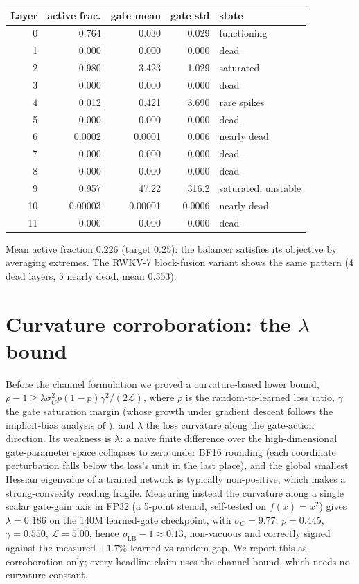 \documentclass[11pt,a4paper]{article}
\newcommand{\LL}{\mathcal{L}}
\begin{document}
\begin{center}
\begin{tabular}{rrrrl}
\toprule
Layer & active frac. & gate mean & gate std & state \\
\midrule
0 & 0.764 & 0.030 & 0.029 & functioning \\
1 & 0.000 & 0.000 & 0.000 & dead \\
2 & 0.980 & 3.423 & 1.029 & saturated \\
3 & 0.000 & 0.000 & 0.000 & dead \\
4 & 0.012 & 0.421 & 3.690 & rare spikes \\
5 & 0.000 & 0.000 & 0.000 & dead \\
6 & 0.0002 & 0.0001 & 0.006 & nearly dead \\
7 & 0.000 & 0.000 & 0.000 & dead \\
8 & 0.000 & 0.000 & 0.000 & dead \\
9 & 0.957 & 47.22 & 316.2 & saturated, unstable \\
10 & 0.00003 & 0.00001 & 0.0006 & nearly dead \\
11 & 0.000 & 0.000 & 0.000 & dead \\
\bottomrule
\end{tabular}
\end{center}

Mean active fraction $0.226$ (target $0.25$): the balancer satisfies its
objective by averaging extremes. The RWKV-7 block-fusion variant shows
the same pattern (4 dead layers, 5 nearly dead, mean $0.353$).

\section{Curvature corroboration: the $\lambda$ bound}
\label{app:lambda}

Before the channel formulation we proved a curvature-based lower bound,
$\rho - 1 \geq \lambda \sigma_C^2 p(1-p)\gamma^2 / (2\LL)$, where $\rho$
is the random-to-learned loss ratio, $\gamma$ the gate saturation margin
(whose growth under gradient descent follows the implicit-bias analysis
of \citealp{soudry2018}),
and $\lambda$ the loss curvature along the gate-action direction. Its
weakness is $\lambda$: a naive finite difference over the
high-dimensional gate-parameter space collapses to zero under BF16
rounding (each coordinate perturbation falls below the loss's unit in
the last place), and the global smallest Hessian eigenvalue of a trained
network is typically non-positive, which makes a strong-convexity
reading fragile. Measuring instead the curvature along a single scalar
gate-gain axis in FP32 (a 5-point stencil, self-tested on $f(x)=x^2$)
gives $\lambda = 0.186$ on the 140M learned-gate checkpoint, with
$\sigma_C = 9.77$, $p = 0.445$, $\gamma = 0.550$, $\LL = 5.00$, hence
$\rho_{\mathrm{LB}} - 1 \approx 0.13$, non-vacuous and correctly signed
against the measured $+1.7\%$ learned-vs-random gap. We report this as
corroboration only; every headline claim uses the channel bound, which
needs no curvature constant.
\end{document}
